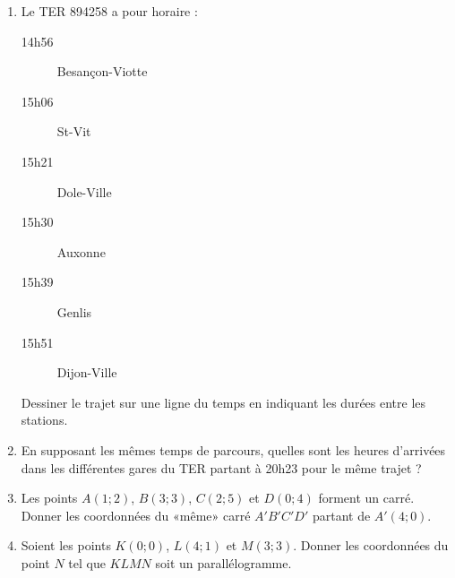 
\begin{multicols}{2}
    \begin{enumerate}
        \item
Le TER 894258 a pour horaire :
\begin{description}
    \item[14h56] Besançon-Viotte
    \item[15h06] St-Vit
    \item[15h21] Dole-Ville
    \item[15h30] Auxonne
    \item[15h39] Genlis
    \item[15h51] Dijon-Ville
\end{description}
Dessiner le trajet sur une ligne du temps en indiquant les durées entre les stations.
        \item
            En supposant les mêmes temps de parcours, quelles sont les heures d'arrivées dans les différentes gares du TER partant à 20h23 pour le même trajet ?
        \item
             Les points \( A(1;2)\), \( B(3;3)\), \( C(2;5)\) et \( D(0;4)\) forment un carré. Donner les coordonnées du «même» carré \( A'B'C'D'\) partant de \( A'(4;0)\).
         \item
             Soient les points \( K(0;0)\), \( L(4;1)\) et \( M(3;3)\). Donner les coordonnées du point \( N\) tel que \( KLMN\) soit un parallélogramme.
    \end{enumerate}
\end{multicols}
